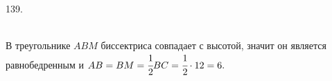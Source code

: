 139. \begin{figure}[ht!]
\end{figure}\\
В треугольнике $ABM$ биссектриса совпадает с высотой, значит он является равнобедренным и $AB=BM=\cfrac{1}{2}BC=\cfrac{1}{2}\cdot12=6.$\\

